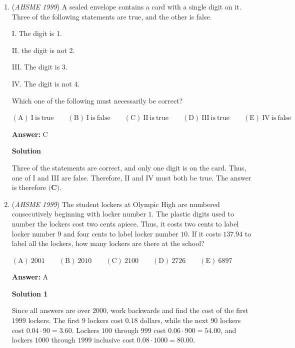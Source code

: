\begin{enumerate}
 On the other hand, $30003 - 29792 = 211 \leq 225$, thus this is the number on the odometer, and the average speed is $\frac{211}3 = \boxed{(D) 70 \frac 13}$.

 


	\item (\textit{AHSME 1999}) A sealed envelope contains a card with a single digit on it. Three of the following statements are true, and the other is false.


 I. The digit is 1.


 II. the digit is not 2. 


 III. The digit is 3.


 IV. The digit is not 4.


 Which one of the following must necessarily be correct?


 $\mathrm{(A) \ I\ is\ true} \qquad \mathrm{(B) \ I\ is\ false} \qquad \mathrm{(C) \ II\ is\ true} \qquad \mathrm{(D) \ III\ is\ true} \qquad \mathrm{(E) \ IV\ is\ false}$

 \textbf{Answer: }C



\textbf{Solution}

Three of the statements are correct, and only one digit is on the card. Thus, one of I and III are false. Therefore, II and IV must both be true. The answer is therefore $\boxed{\textbf{(C)}}$.

 


	\item (\textit{AHSME 1999}) The student lockers at Olympic High are numbered consecutively beginning with locker number $1$. The plastic digits used to number the lockers cost two cents apiece. Thus, it costs two cents to label locker number $9$ and four cents to label locker number $10$. If it costs $137.94$ to label all the lockers, how many lockers are there at the school?


 $\mathrm{(A) \ }2001 \qquad \mathrm{(B) \ }2010 \qquad \mathrm{(C) \ }2100 \qquad \mathrm{(D) \ }2726 \qquad \mathrm{(E) \ }6897$

 \textbf{Answer: }A



\textbf{Solution 1}

Since all answers are over $2000$, work backwards and find the cost of the first $1999$ lockers.  The first $9$ lockers cost $0.18$ dollars, while the next $90$ lockers cost $0.04\cdot 90 = 3.60$.  Lockers $100$ through $999$ cost $0.06\cdot 900 = 54.00$, and lockers $1000$ through $1999$ inclusive cost $0.08\cdot 1000 = 80.00$.


\end{enumerate}
